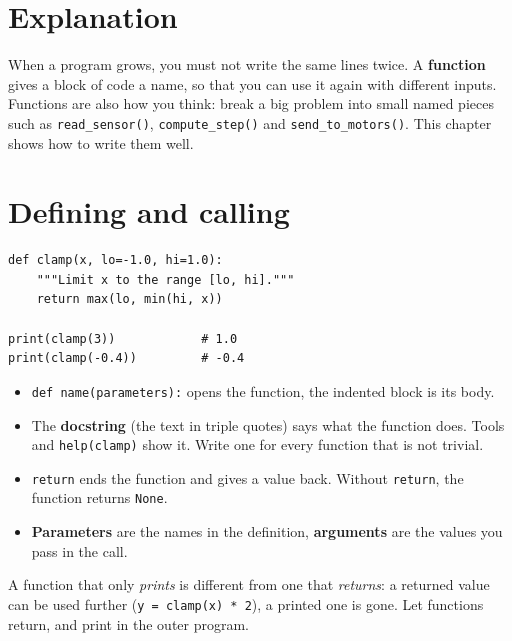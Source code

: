 \label{ch:py3}

\section*{Explanation}
When a program grows, you must not write the same lines twice. A \textbf{function} gives a block of code a name, so that you can use it again with different inputs. Functions are also how you think: break a big problem into small named pieces such as \texttt{read\_sensor()}, \texttt{compute\_step()} and \texttt{send\_to\_motors()}. This chapter shows how to write them well.

\section*{Defining and calling}
\begin{verbatim}
def clamp(x, lo=-1.0, hi=1.0):
    """Limit x to the range [lo, hi]."""
    return max(lo, min(hi, x))

print(clamp(3))            # 1.0
print(clamp(-0.4))         # -0.4
\end{verbatim}
\begin{center}
\label{fig:py3_func}
\end{center}
\begin{itemize}[nosep]
  \item \texttt{def name(parameters):} opens the function, the indented block is its body.
  \item The \textbf{docstring} (the text in triple quotes) says what the function does. Tools and \texttt{help(clamp)} show it. Write one for every function that is not trivial.
  \item \texttt{return} ends the function and gives a value back. Without \texttt{return}, the function returns \texttt{None}.
  \item \textbf{Parameters} are the names in the definition, \textbf{arguments} are the values you pass in the call.
\end{itemize}
A function that only \emph{prints} is different from one that \emph{returns}: a returned value can be used further (\verb!y = clamp(x) * 2!), a printed one is gone. Let functions return, and print in the outer program.


